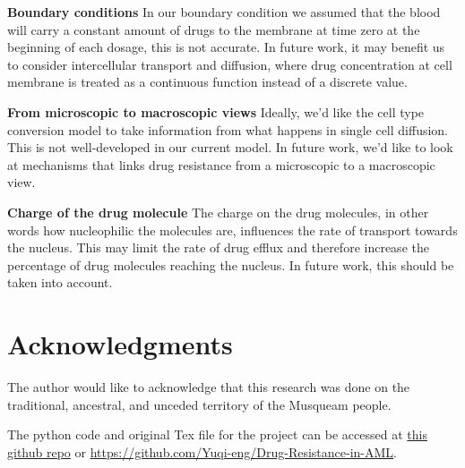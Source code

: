 \documentclass{edm_article}
\begin{document}
\textbf{Boundary conditions} In our boundary condition we assumed that the blood will carry a constant amount of drugs to the membrane at time zero at the beginning of each dosage, this is not accurate. In future work, it may benefit us to consider intercellular transport and diffusion, where drug concentration at cell membrane is treated as a continuous function instead of a discrete value. 

\textbf{From microscopic to macroscopic views} Ideally, we'd like the cell type conversion model to take information from what happens in single cell diffusion. This is not well-developed in our current model. In future work, we'd like to look at mechanisms that links drug resistance from a microscopic to a macroscopic view. 

\textbf{Charge of the drug molecule} The charge on the drug molecules, in other words how nucleophilic the molecules are, influences the rate of transport towards the nucleus. This may limit the rate of drug efflux and therefore increase the percentage of drug molecules reaching the nucleus. In future work, this should be taken into account. 

\section{Acknowledgments}
The author would like to acknowledge that this research was done on the traditional, ancestral, and unceded territory of the Musqueam people.

%



\begin{appendix}
The python code and original Tex file for the project can be accessed at \href{https://github.com/Yuqi-eng/Drug-Resistance-in-AML}{this github repo} or \url{https://github.com/Yuqi-eng/Drug-Resistance-in-AML}.
\end{appendix}
\end{document}
